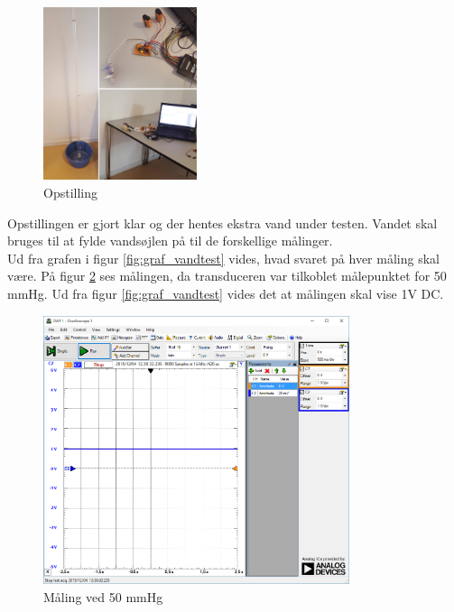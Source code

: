 \begin{figure}[H]
	\centering
	\includegraphics[width=0.4\textwidth]{Figurer/vandtest_opstilling}
	\caption{Opstilling}
	\label{fig:vandtest_opstilling}
\end{figure} 
Opstillingen er gjort klar og der hentes ekstra vand under testen. Vandet skal bruges til at fylde vandsøjlen på til de forskellige målinger. \\
Ud fra grafen i figur \ref{fig:graf_vandtest} vides, hvad svaret på hver måling skal være. På figur \ref{fig:vandtest_måling50} ses målingen, da transduceren var tilkoblet målepunktet for 50 mmHg. Ud fra figur \ref{fig:graf_vandtest} vides det at målingen skal vise 1V DC.  
\begin{figure}[H]
	\centering	\includegraphics[width=0.8\textwidth]{Figurer/50mmhg}
	\caption{Måling ved 50 mmHg}
	\label{fig:vandtest_måling50}
\end{figure}
 
